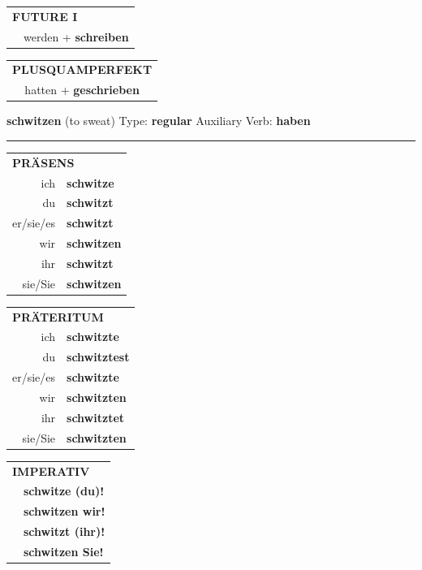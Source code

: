 \documentclass[10pt,a4paper]{revtex4-2}
\begin{document}
\begin{verbbox-acc}
\begin{tabular}{rl}
    \multicolumn{2}{l}{\textbf{FUTURE I} }\\
  &  werden + \textbf{schreiben}\\
 
  \end{tabular}
\hfill
   \begin{tabular}{rl}
      \multicolumn{2}{l}{\textbf{PLUSQUAMPERFEKT}}\\
  &  hatten + \textbf{geschrieben}\\
  \end{tabular}
  
  \vspace{-5pt}


\end{verbbox-acc}


\begin{verbbox}
{\Large \bf schwitzen} (to sweat) \hfill Type: \textbf{regular} \hfill Auxiliary Verb: \textbf{haben}

\vspace{5pt}
\hrule
\vspace{5pt}

\begin{tabular}{rl}
\multicolumn{2}{l}{\textbf{PRÄSENS}}\\
ich & \textbf{schwitze}\\
du & \textbf{schwitzt}\\
er/sie/es & \textbf{schwitzt}\\
wir & \textbf{schwitzen}\\
ihr & \textbf{schwitzt}\\
sie/Sie & \textbf{schwitzen}\\
\end{tabular}
\hfill
\begin{tabular}{rl}
\multicolumn{2}{l}{\textbf{PRÄTERITUM}}\\
ich & \textbf{schwitzte}\\
du & \textbf{schwitztest}\\
er/sie/es & \textbf{schwitzte}\\
wir & \textbf{schwitzten}\\
ihr & \textbf{schwitztet}\\
sie/Sie & \textbf{schwitzten}\\
\end{tabular}
\hfill
\begin{tabular}{rl}
\multicolumn{2}{l}{\textbf{IMPERATIV}}\\
& \textbf{schwitze (du)!}\\
& \textbf{schwitzen wir!}\\
& \textbf{schwitzt (ihr)!}\\
& \textbf{schwitzen Sie!}\\
\end{tabular}


\end{verbbox}
\end{document}
